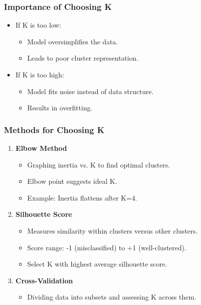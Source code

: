 \documentclass[aspectratio=169]{beamer}
\begin{document}
\begin{frame}[fragile]
    \frametitle{Importance of Choosing K}
    \begin{itemize}
        \item If K is too low:
        \begin{itemize}
            \item Model oversimplifies the data.
            \item Leads to poor cluster representation.
        \end{itemize}
        \item If K is too high:
        \begin{itemize}
            \item Model fits noise instead of data structure.
            \item Results in overfitting.
        \end{itemize}
    \end{itemize}
\end{frame}

\begin{frame}[fragile]
    \frametitle{Methods for Choosing K}
    \begin{enumerate}
        \item \textbf{Elbow Method}
        \begin{itemize}
            \item Graphing inertia vs. K to find optimal clusters.
            \item Elbow point suggests ideal K. 
            \item Example: Inertia flattens after K=4.
        \end{itemize}
        \item \textbf{Silhouette Score}
        \begin{itemize}
            \item Measures similarity within clusters versus other clusters.
            \item Score range: -1 (misclassified) to +1 (well-clustered).
            \item Select K with highest average silhouette score.
        \end{itemize}
        \item \textbf{Cross-Validation}
        \begin{itemize}
            \item Dividing data into subsets and assessing K across them.
        \end{itemize}
    \end{enumerate}
\end{frame}
\end{document}
